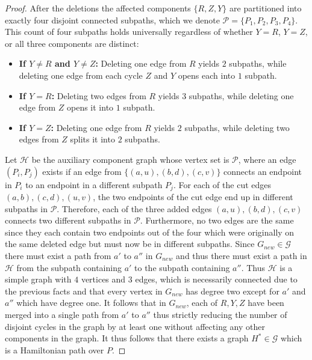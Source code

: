 \documentclass{article}
\theoremstyle{definition}
\newcommand{\GraphSet}{\mathcal{G}}
\newcommand{\PathSet}{\mathcal{P}}
\begin{document}
\begin{proof}
    After the deletions the affected components $\{R, Z, Y\}$ are partitioned into exactly four disjoint connected subpaths, which we denote $\PathSet = \{P_1, P_2, P_3, P_4\}$. 
    This count of four subpaths holds universally regardless of whether $Y = R$, $Y = Z$, or all three components are distinct:
    \begin{itemize}
        \item \textbf{If $Y \neq R$ and $Y \neq Z$:} Deleting one edge from $R$ yields $2$ subpaths, while deleting one edge from each cycle $Z$ and $Y$ opens each into $1$ subpath.
        \item \textbf{If $Y = R$:} Deleting two edges from $R$ yields $3$ subpaths, while deleting one edge from $Z$ opens it into $1$ subpath.
        \item \textbf{If $Y = Z$:} Deleting one edge from $R$ yields $2$ subpaths, while deleting two edges from $Z$ splits it into $2$ subpaths.
    \end{itemize}
    Let $\mathcal{H}$ be the auxiliary component graph whose vertex set is $\mathcal{P}$, where an edge $(P_i, P_j)$ exists if an edge from $\{(a,u), (b,d), (c,v)\}$ connects an endpoint in $P_i$ to an endpoint in a different subpath $P_j$.
    For each of the cut edges $(a,b),(c,d),(u,v)$, the two endpoints of the cut edge end up in different subpaths in $\mathcal{P}$.
    Therefore, each of the three added edges $(a,u),(b,d),(c,v)$ connects two different subpaths in $\mathcal{P}$.
    Furthermore, no two edges are the same since they each contain two endpoints out of the four which were originally on the same deleted edge but must now be in different subpaths.
    Since $G_{new} \in \GraphSet$ there must exist a path from $a'$ to $a''$ in $G_{new}$ and thus there must exist a path in $\mathcal{H}$ from the subpath containing $a'$ to the subpath containing $a''$.
    Thus $\mathcal{H}$ is a simple graph with $4$ vertices and $3$ edges, which is necessarily connected due to the previous facts and that every vertex in $G_{new}$ has degree two except for $a'$ and $a''$ which have degree one.
    It follows that in $G_{new}$, each of $R,Y,Z$ have been merged into a single path from $a'$ to $a''$ thus strictly reducing the number of disjoint cycles in the graph by at least one without affecting any other components in the graph.
    It thus follows that there exists a graph $H^* \in \GraphSet$ which is a Hamiltonian path over $P$.


\end{proof}
\end{document}
